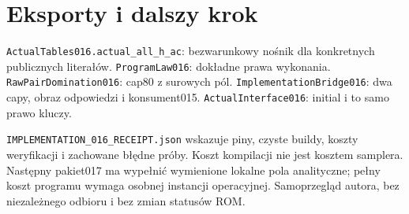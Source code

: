 \documentclass[11pt,a4paper]{article}
\newcommand{\code}[1]{\nolinkurl{#1}}
\begin{document}
\appendix\section{Eksporty i dalszy krok}
\code{ActualTables016.actual_all_h_ac}: bezwarunkowy nośnik dla konkretnych
publicznych literałów. \code{ProgramLaw016}: dokładne prawa wykonania.
\code{RawPairDomination016}: cap80 z surowych pól.
\code{ImplementationBridge016}: dwa capy, obraz odpowiedzi i konsument015.
\code{ActualInterface016}: initial i to samo prawo kluczy.

\code{IMPLEMENTATION_016_RECEIPT.json} wskazuje piny, czyste buildy, koszty
weryfikacji i zachowane błędne próby. Koszt kompilacji nie jest kosztem
samplera. Następny pakiet017 ma wypełnić wymienione lokalne pola
analityczne; pełny koszt programu wymaga osobnej instancji operacyjnej.
Samoprzegląd autora, bez niezależnego odbioru i bez zmian statusów ROM.
\end{document}
